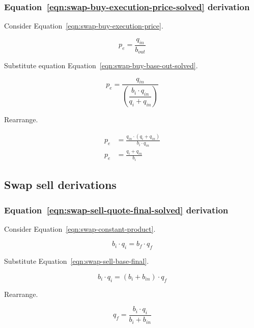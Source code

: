 \documentclass[table, twocolumn]{article}
\begin{document}
\subsubsection{Equation~\ref{eqn:swap-buy-execution-price-solved} derivation}%
\label{sssec:equation-eqn-swap-buy-execution-price-solved-derivation}

Consider Equation~\ref{eqn:swap-buy-execution-price}.

\begin{equation}
	p_e = \frac{q_{in}}{b_{out}} \nonumber
\end{equation}

Substitute equation Equation~\ref{eqn:swap-buy-base-out-solved}.

\begin{equation}
	p_e = \frac{q_{in}}{\left(\dfrac{b_i \cdot q_{in}}{q_i + q_{in}}\right)} \nonumber
\end{equation}

Rearrange.

\begin{align}
	p_e & = \frac{q_{in} \cdot (q_i + q_{in})}{b_i \cdot q_{in}} \nonumber \\
	p_e & = \frac{q_i + q_{in}}{b_i} \nonumber
\end{align}

\subsection{Swap sell derivations}\label{ssec:swap-sell-derivations}

\subsubsection{Equation~\ref{eqn:swap-sell-quote-final-solved} derivation}%
\label{sssec:equation-eqn-swap-sell-quote-final-solved-derivation}

Consider Equation~\ref{eqn:swap-constant-product}.

\begin{equation}
	b_i \cdot q_i = b_f \cdot q_f \nonumber
\end{equation}

Substitute Equation~\ref{eqn:swap-sell-base-final}.

\begin{equation}
	b_i \cdot q_i = (b_i + b_{in}) \cdot q_f \nonumber
\end{equation}

Rearrange.

\begin{equation}
	q_f = \frac{b_i \cdot q_i}{b_i + b_{in}} \nonumber
\end{equation}
\end{document}
